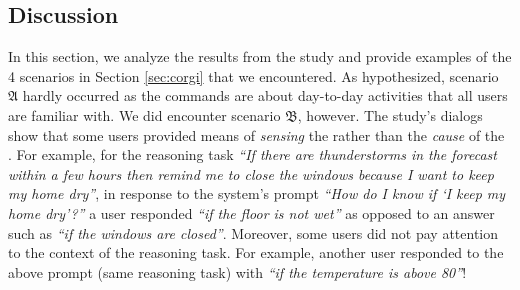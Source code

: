 \vspace{-0.5em}
\subsection{Discussion}
In this section, we analyze the results from the study and provide examples of the 4 scenarios in Section \ref{sec:corgi} that we encountered. As hypothesized, scenario $\mathfrak{A}$ 
hardly occurred as the commands are about day-to-day activities that all users are familiar with.
We did encounter scenario $\mathfrak{B}$, however. The study's dialogs show that some users provided means of \emph{sensing} the \textGoal rather than the \emph{cause} of the \textGoal.
For example, for the reasoning task \emph{``If there are thunderstorms in the forecast within a few hours then remind me to close the windows because I want to keep my home dry''}, in response to the system's prompt \emph{``How do I know if `I keep my home dry'?''} a user responded \emph{``if the floor is not wet''} as opposed to an answer such as \emph{``if the windows are closed''}. Moreover, some users did not pay attention to the context of the reasoning task. For example, another user responded to the above prompt (same reasoning task) %
with \emph{``if the temperature is above 80''}! %
